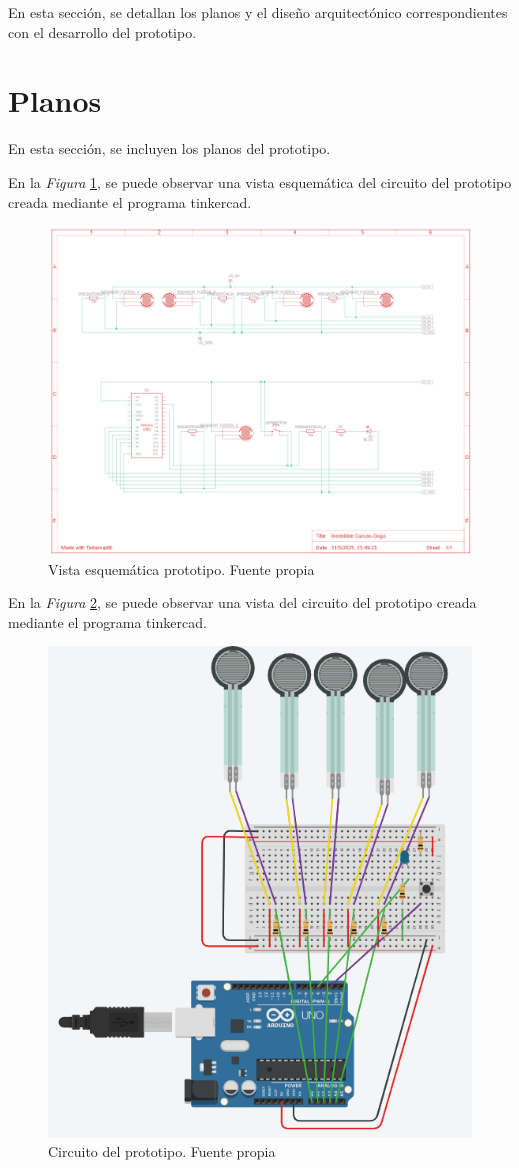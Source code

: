 En esta sección, se detallan los planos y el diseño arquitectónico correspondientes con el desarrollo del prototipo.
\section{Planos}
En esta sección, se incluyen los planos del prototipo. 

En la \textit{Figura} \ref{fig:Vista esquemática prototipo.}, se puede observar una vista esquemática del circuito del prototipo creada mediante el programa tinkercad. 

\begin{figure}
    \centering
    \includegraphics[width=0.8\linewidth]{img/Vista esquematica prototipo.png}
    \caption{Vista esquemática prototipo. Fuente propia}
    \label{fig:Vista esquemática prototipo.}
\end{figure}

En la \textit{Figura} \ref{fig:Circuito del prototipo}, se puede observar una vista del circuito del prototipo creada mediante el programa tinkercad. 

\begin{figure}
    \centering
    \includegraphics[width=0.5\linewidth]{img/Circuito.png}
    \caption{Circuito del prototipo. Fuente propia}
    \label{fig:Circuito del prototipo}
\end{figure}

